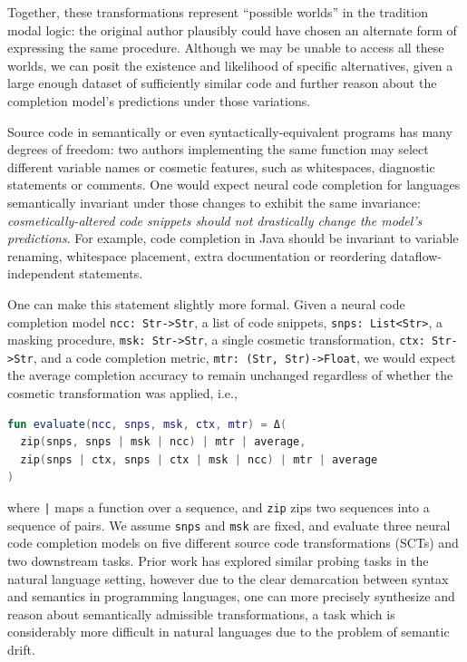 \documentclass[sigconf,review,anonymous]{acmart}
\begin{document}
  Together, these transformations represent ``possible worlds'' in the tradition modal logic: the original author plausibly could have chosen an alternate form of expressing the same procedure. Although we may be unable to access all these worlds, we can posit the existence and likelihood of specific alternatives, given a large enough dataset of sufficiently similar code and further reason about the completion model's predictions under those variations.

  Source code in semantically or even syntactically-equivalent programs has many degrees of freedom: two authors implementing the same function may select different variable names or cosmetic features, such as whitespaces, diagnostic statements or comments. One would expect neural code completion for languages semantically invariant under those changes to exhibit the same invariance: \textit{cosmetically-altered code snippets should not drastically change the model's predictions}. For example, code completion in Java should be invariant to variable renaming, whitespace placement, extra documentation or reordering dataflow-independent statements.

  One can make this statement slightly more formal. Given a neural code completion model \lstinline|ncc: Str->Str|, a list of code snippets, \lstinline|snps: List<Str>|, a masking procedure, \lstinline|msk: Str->Str|, a single cosmetic transformation, \lstinline|ctx: Str->Str|, and a code completion metric, \lstinline|mtr: (Str, Str)->Float|, we would expect the average completion accuracy to remain unchanged regardless of whether the cosmetic transformation was applied, i.e.,

  \noindent\begin{lstlisting}[basicstyle=\footnotesize\ttfamily, language=kotlin,label={lst:lstlisting}]
fun evaluate(ncc, snps, msk, ctx, mtr) = Δ(
  zip(snps, snps | msk | ncc) | mtr | average,
  zip(snps | ctx, snps | ctx | msk | ncc) | mtr | average
)
  \end{lstlisting}

  \noindent where \texttt{|} maps a function over a sequence, and \lstinline|zip| zips two sequences into a sequence of pairs. We assume \lstinline|snps| and \lstinline|msk| are fixed, and evaluate three neural code completion models on five different source code transformations (SCTs) and two downstream tasks. Prior work has explored similar probing tasks in the natural language setting, however due to the clear demarcation between syntax and semantics in programming languages, one can more precisely synthesize and reason about semantically admissible transformations, a task which is considerably more difficult in natural languages due to the problem of semantic drift.
\end{document}
